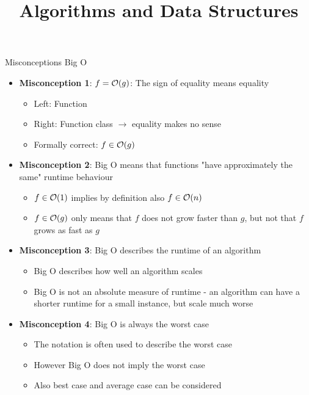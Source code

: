 \documentclass[11pt,compress,t,notes=noshow, xcolor=table]{beamer}
\title{Algorithms and Data Structures}
\begin{document}


\begin{vbframe}{Misconceptions Big O}

\begin{itemize}

\item \textbf{Misconception 1}: $f = \mathcal{O}(g)$: The sign of equality means equality \\
  \begin{itemize}
  \item Left: Function
  \item Right: Function class $\to$ equality makes no sense
  \item Formally correct: $f \in \mathcal{O}(g)$
  \end{itemize}

\item \textbf{Misconception 2}: Big O means that functions "have approximately the same" runtime behaviour
  \begin{itemize}
  \item $f \in \mathcal{O}(1)$ implies by definition also $f \in \mathcal{O}(n)$
  \item $f \in \mathcal{O}(g)$ only means that $f$ does not grow faster than $g$, but not that $f$ grows as fast as $g$
  \end{itemize}
  \framebreak
\item \textbf{Misconception 3}: Big O describes the runtime of an algorithm
  \begin{itemize}
  \item Big O describes how well an algorithm scales
  \item Big O is not an absolute measure of runtime - an algorithm can have a shorter runtime for a small instance, but scale much worse
  \end{itemize}
\item \textbf{Misconception 4}: Big O is always the worst case
  \begin{itemize}
  \item The notation is often used to describe the worst case
  \item However Big O does not imply the worst case
  \item Also best case and average case can be considered
  \end{itemize}
\end{itemize}
\end{vbframe}
\end{document}
